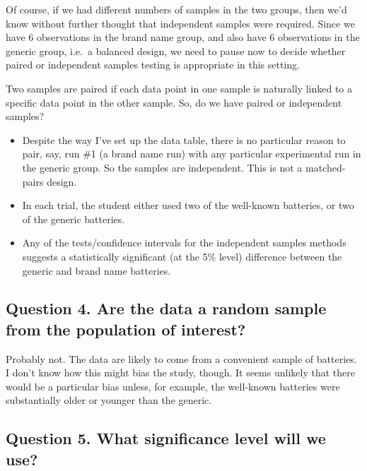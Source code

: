 \documentclass[
]{book}
\providecommand{\tightlist}{%
  \setlength{\itemsep}{0pt}\setlength{\parskip}{0pt}}
\begin{document}
Of course, if we had different numbers of samples in the two groups, then we'd know without further thought that independent samples were required. Since we have 6 observations in the brand name group, and also have 6 observations in the generic group, i.e.~a balanced design, we need to pause now to decide whether paired or independent samples testing is appropriate in this setting.

Two samples are paired if each data point in one sample is naturally linked to a specific data point in the other sample. So, do we have paired or independent samples?

\begin{itemize}
\tightlist
\item
  Despite the way I've set up the data table, there is no particular reason to pair, say, run \#1 (a brand name run) with any particular experimental run in the generic group. So the samples are independent. This is not a matched-pairs design.
\item
  In each trial, the student either used two of the well-known batteries, or two of the generic batteries.
\item
  Any of the tests/confidence intervals for the independent samples methods suggests a statistically significant (at the 5\% level) difference between the generic and brand name batteries.
\end{itemize}

\hypertarget{question-4.-are-the-data-a-random-sample-from-the-population-of-interest}{%
\subsection{Question 4. Are the data a random sample from the population of interest?}\label{question-4.-are-the-data-a-random-sample-from-the-population-of-interest}}

Probably not. The data are likely to come from a convenient sample of batteries. I don't know how this might bias the study, though. It seems unlikely that there would be a particular bias unless, for example, the well-known batteries were substantially older or younger than the generic.

\hypertarget{question-5.-what-significance-level-will-we-use}{%
\subsection{Question 5. What significance level will we use?}\label{question-5.-what-significance-level-will-we-use}}
\end{document}

